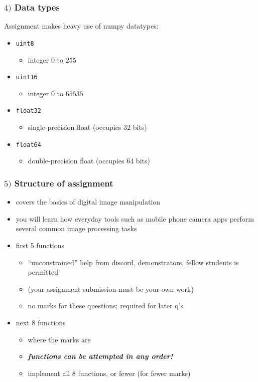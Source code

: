 \documentclass[english,14pt]{beamer}
\begin{document}
\begin{frame}[fragile]

\frametitle{$4)$ Data types}

Assignment makes heavy use of numpy datatypes:
\vspace*{5mm}
\begin{itemize}
	\item \texttt{uint8}
	\begin{itemize}
		\item integer $0$ to $255$
	\end{itemize}
	\item \texttt{uint16}
	\begin{itemize}
		\item integer $0$ to $65535$
	\end{itemize}
	\item \texttt{float32}
	\begin{itemize}
		\item single-precision float (occupies $32$ bits)
	\end{itemize}
	\item \texttt{float64}
	\begin{itemize}
		\item double-precision float (occupies $64$ bits)
	\end{itemize}	
\end{itemize}

\end{frame}


\begin{frame}[fragile]

\frametitle{$5)$ Structure of assignment}

\begin{itemize}
	\item covers the basics of digital image manipulation
	\item you will learn how everyday tools such as mobile phone camera apps perform several common image processing tasks
	\item first 5 functions
	\begin{itemize}
		\item ``unconstrained'' help from discord, demonstrators, fellow students is permitted
		\item[] (your assignment submission must be your own work)
		\item no marks for these questions; required for later q's
	\end{itemize}
	\item next 8 functions
	\begin{itemize}
		\item where the marks are
		\item \emph{\textbf{functions can be attempted in any order! }}
		\item implement all 8 functions, or fewer (for fewer marks)
	\end{itemize}
\end{itemize}

\end{frame}
\end{document}
